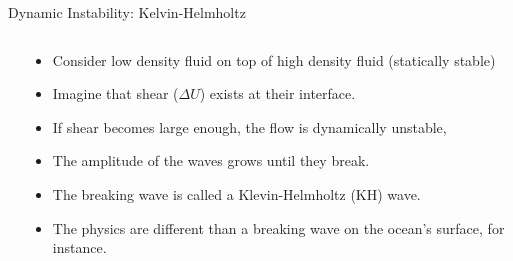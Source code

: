 \begin{frame}{Dynamic Instability: Kelvin-Helmholtz}
\begin{columns}[T]
\begin{column}{.3\textwidth}
\begin{minipage}[c][0.75\textheight][c]{\linewidth}
    	\end{minipage}
    \end{column}
    \begin{column}{.7\textwidth}
    	\begin{itemize}
    		\item Consider low density fluid on top of high density fluid (statically stable)
    		\item Imagine that shear ($\Delta U$) exists at their interface.
    		\item If shear becomes large enough, the flow is dynamically unstable,
    		\item The amplitude of the waves grows until they break.
    		\item The breaking wave is called a Klevin-Helmholtz (KH) wave.
    		\item The physics are different than a breaking wave on the ocean's surface, for instance.
    	\end{itemize}
    \end{column}
  \end{columns}
\end{frame}
